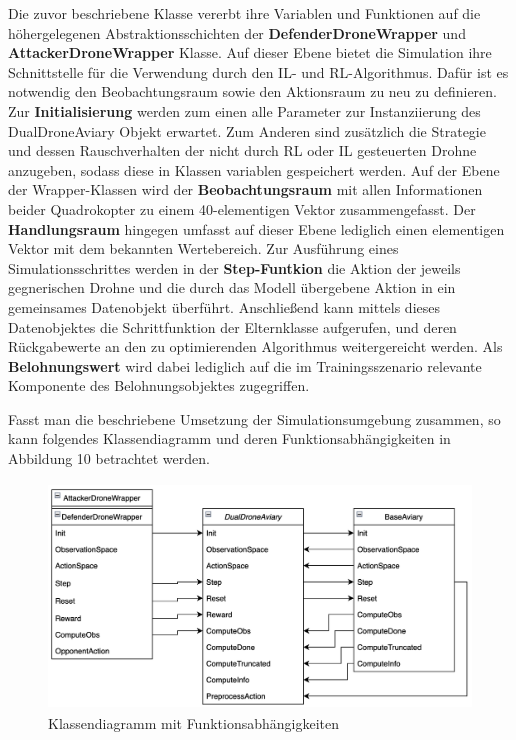 Die zuvor beschriebene Klasse vererbt ihre Variablen und Funktionen auf die höhergelegenen Abstraktionsschichten der \textbf{DefenderDroneWrapper} und \textbf{AttackerDroneWrapper} Klasse.
Auf dieser Ebene bietet die Simulation ihre Schnittstelle für die Verwendung durch den IL- und RL-Algorithmus.
Dafür ist es notwendig den Beobachtungsraum sowie den Aktionsraum zu neu zu definieren.
Zur \textbf{Initialisierung} werden zum einen alle Parameter zur Instanziierung des DualDroneAviary Objekt erwartet.
Zum Anderen sind zusätzlich die Strategie und dessen Rauschverhalten der nicht durch RL oder IL gesteuerten Drohne anzugeben, sodass diese in Klassen variablen gespeichert werden.
Auf der Ebene der Wrapper-Klassen wird der \textbf{Beobachtungsraum} mit allen Informationen beider Quadrokopter zu einem 40-elementigen Vektor zusammengefasst.
Der \textbf{Handlungsraum} hingegen umfasst auf dieser Ebene lediglich einen elementigen Vektor mit dem bekannten Wertebereich.
Zur Ausführung eines Simulationsschrittes werden in der \textbf{Step-Funtkion} die Aktion der jeweils gegnerischen Drohne und die durch das Modell übergebene Aktion in ein gemeinsames Datenobjekt überführt.
Anschließend kann mittels dieses Datenobjektes die Schrittfunktion der Elternklasse aufgerufen, und deren Rückgabewerte an den zu optimierenden Algorithmus weitergereicht werden.
Als \textbf{Belohnungswert} wird dabei lediglich auf die im Trainingsszenario relevante Komponente des Belohnungsobjektes zugegriffen.

Fasst man die beschriebene Umsetzung der Simulationsumgebung zusammen, so kann folgendes Klassendiagramm und deren Funktionsabhängigkeiten in Abbildung 10 betrachtet werden.

\begin{figure}[htb]
    \centering
    \includegraphics[height=6cm]{lib/graphics/simenv structure.png}
    \caption[Klassendiagramm mit Funktionsabhängigkeiten]{Klassendiagramm mit Funktionsabhängigkeiten\footnotemark}
    \label{abb:drone axis}
\end{figure}

